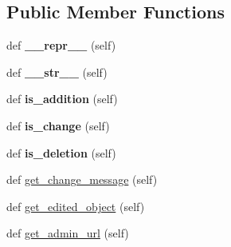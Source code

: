\subsection*{Public Member Functions}
\begin{DoxyCompactItemize}
\item 
\mbox{\label{classdjango_1_1contrib_1_1admin_1_1models_1_1_log_entry_a252358230b079c90b8ba0b03cd14020a}} 
def {\bfseries \+\_\+\+\_\+repr\+\_\+\+\_\+} (self)
\item 
\mbox{\label{classdjango_1_1contrib_1_1admin_1_1models_1_1_log_entry_a9181921762ee29ac203181b78e047bae}} 
def {\bfseries \+\_\+\+\_\+str\+\_\+\+\_\+} (self)
\item 
\mbox{\label{classdjango_1_1contrib_1_1admin_1_1models_1_1_log_entry_a5fc7128b2ba9ef2c4c2ff04b940d324c}} 
def {\bfseries is\+\_\+addition} (self)
\item 
\mbox{\label{classdjango_1_1contrib_1_1admin_1_1models_1_1_log_entry_a014e0131930ca86c1762ba99fd621d73}} 
def {\bfseries is\+\_\+change} (self)
\item 
\mbox{\label{classdjango_1_1contrib_1_1admin_1_1models_1_1_log_entry_a731f2d067f10fe20a2966df0ff204898}} 
def {\bfseries is\+\_\+deletion} (self)
\item 
def \mbox{\hyperlink{classdjango_1_1contrib_1_1admin_1_1models_1_1_log_entry_a12adcbaf7f42e936c14a66e98ac2514d}{get\+\_\+change\+\_\+message}} (self)
\item 
def \mbox{\hyperlink{classdjango_1_1contrib_1_1admin_1_1models_1_1_log_entry_a6eb5721255d01d593dd84c18e0729dba}{get\+\_\+edited\+\_\+object}} (self)
\item 
def \mbox{\hyperlink{classdjango_1_1contrib_1_1admin_1_1models_1_1_log_entry_a4445b31a6b979c91d814a860ac59fa3b}{get\+\_\+admin\+\_\+url}} (self)
\end{DoxyCompactItemize}
